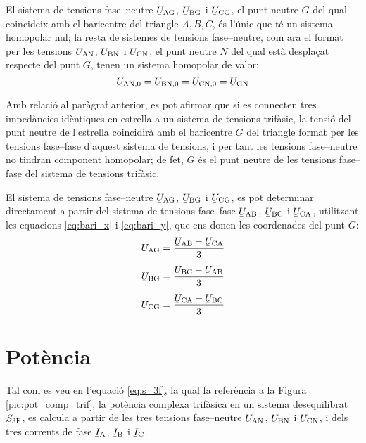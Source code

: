 El sistema de tensions fase--neutre
$\cmplx{U}\ped{AG}$, $\cmplx{U}\ped{BG}$ i $\cmplx{U}\ped{CG}$,
el punt neutre $G$ del qual coincideix amb el baricentre del
triangle $A, B,
 C$, és l'únic que té un sistema homopolar nul; la resta de sistemes de tensions
 fase--neutre, com ara el format per les tensions $\cmplx{U}\ped{AN}$, $\cmplx{U}\ped{BN}$ i $\cmplx{U}\ped{CN}$,
 el punt neutre $N$ del qual està desplaçat respecte del punt $G$, tenen un sistema
 homopolar de valor:
\begin{equation}
    \cmplx{U}\ped{AN,0} = \cmplx{U}\ped{BN,0} =
    \cmplx{U}\ped{CN,0} = \cmplx{U}\ped{GN}\label{eq:tens-hom}
\end{equation}

Amb relació al paràgraf anterior, es pot afirmar que si es
connecten tres impedàncies idèntiques en estrella a un sistema
de tensions trifàsic, la tensió del punt neutre de l'estrella
coincidirà amb el baricentre $G$ del triangle format per les tensions
fase--fase d'aquest sistema de tensions, i per tant les tensions fase--neutre no tindran
component homopolar; de fet, $G$ és el punt neutre de les tensions
fase--fase del sistema de tensions trifàsic.

El sistema de tensions fase--neutre
$\cmplx{U}\ped{AG}$, $\cmplx{U}\ped{BG}$ i $\cmplx{U}\ped{CG}$, es pot determinar directament a partir del sistema de tensions fase--fase $\cmplx{U}\ped{AB}$, $\cmplx{U}\ped{BC}$ i $\cmplx{U}\ped{CA}$, utilitzant les equacions \eqref{eq:bari_x} i \eqref{eq:bari_y}, que ens donen les coordenades del punt $G$:
\begin{subequations}
\begin{align}
    \cmplx{U}\ped{AG} &= \frac{\cmplx{U}\ped{AB}-\cmplx{U}\ped{CA}}{3}\label{eq:uag}\\[1ex]
    \cmplx{U}\ped{BG} &= \frac{\cmplx{U}\ped{BC}-\cmplx{U}\ped{AB}}{3}\label{eq:ubg}\\[1ex]
    \cmplx{U}\ped{CG} &= \frac{\cmplx{U}\ped{CA}-\cmplx{U}\ped{BC}}{3}\label{eq:ucg}
\end{align}
\end{subequations}

\section{Potència} 

Tal com es veu en l'equació \eqref{eq:s_3f}, la qual fa referència a
la Figura \vref{pic:pot_comp_trif}, la potència complexa trifàsica
en un sistema desequilibrat $\cmplx{S}\ped{3F}$, es calcula a partir
de les tres tensions fase--neutre $\cmplx{U}\ped{AN}$,
$\cmplx{U}\ped{BN}$ i $\cmplx{U}\ped{CN}$, i dels tres
corrents de fase $\cmplx{I}\ped{A}$, $\cmplx{I}\ped{B}$ i
$\cmplx{I}\ped{C}$.


